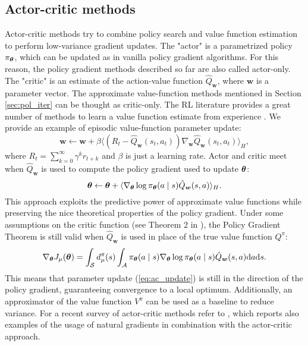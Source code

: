 \subsection{Actor-critic methods}
Actor-critic methods try to combine policy search and value function estimation to perform low-variance gradient updates. The "actor" is a parametrized policy $\pi_{\boldsymbol{\theta}}$, which can be updated as in vanilla policy gradient algorithms. For this reason, the policy gradient methods described so far are also called actor-only. The "critic" is an estimate of the action-value function $\hat{Q}_{\boldsymbol{w}}$, where $\boldsymbol{w}$ is a parameter vector. The approximate value-function methods mentioned in Section \ref{sec:pol_iter} can be thought as critic-only. The \ac{RL} literature provides a great number of methods to learn a value function estimate from experience \cite{Sutton:1998:IRL:551283}. We provide an example of episodic value-function parameter update:
\[
	\boldsymbol{w} \gets \boldsymbol{w} + \beta\langle
		(R_t-\hat{Q}_{\boldsymbol{w}}(s_t,a_t))
		\nabla_{\boldsymbol{w}}\hat{Q}_{\boldsymbol{w}}(s_t,a_t)\rangle_H,
\] 
where $R_t = \sum\limits_{k=0}^{\infty}\gamma^kr_{t+k}$ and $\beta$ is just a learning rate.
Actor and critic meet when $\hat{Q}_{\boldsymbol{w}}$ is used to compute the policy gradient used to update $\boldsymbol{\theta}$:
\begin{equation}\label{eq:ac_update} 
	\boldsymbol{\theta} \gets \boldsymbol{\theta} + \langle\nabla_{\boldsymbol{\theta}}\log\pi_{\boldsymbol{\theta}}(a \mid s) \hat{Q}_{\boldsymbol{w}}(s,a)\rangle_H.
\end{equation}
This approach exploits the predictive power of approximate value functions while preserving the nice theoretical properties of the policy gradient. Under some assumptions on the critic function (see Theorem 2 in \cite{Sutton1999a}), the Policy Gradient Theorem is still valid when $\hat{Q}_{\boldsymbol{w}}$ is used in place of the true value function $Q^\pi$:
\[
	\nabla_{\boldsymbol{\theta}}J_\mu(\boldsymbol{\theta}) = \int_{\mathcal{S}}d_{\mu}^{\pi}(s)
		\int_{\mathcal{A}}\pi_{\boldsymbol{\theta}}(a \mid s)\nabla_{\boldsymbol{\theta}}\log\pi_{\boldsymbol{\theta}}(a \mid s)
		\hat{Q}_{\boldsymbol{w}}(s,a)\mathrm{d}a\mathrm{d}s.
\]
This means that parameter update (\ref{eq:ac_update}) is still in the direction of the policy gradient, guaranteeing convergence to a local optimum.
Additionally, an approximator of the value function $V^\pi$ can be used as a baseline to reduce variance.
For a recent survey of actor-critic methods refer to \cite{grondman2012survey}, which reports also examples of the usage of natural gradients in combination with the actor-critic approach.

